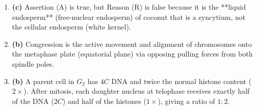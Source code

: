 \documentclass[11pt,a4paper]{article}
\begin{document}
\begin{enumerate}[label=\textbf{\arabic*.}, leftmargin=*]
\item \textbf{(c)} Assertion (A) is true, but Reason (R) is false because it is the **liquid endosperm** (free-nuclear endosperm) of coconut that is a syncytium, not the cellular endosperm (white kernel).

\item \textbf{(b)} Congression is the active movement and alignment of chromosomes onto the metaphase plate (equatorial plane) via opposing pulling forces from both spindle poles.

\item \textbf{(b)} A parent cell in $G_2$ has $4C$ DNA and twice the normal histone content ($2\times$). After mitosis, each daughter nucleus at telophase receives exactly half of the DNA ($2C$) and half of the histones ($1\times$), giving a ratio of $1 : 2$.

\end{enumerate}
\end{document}

